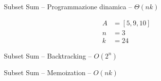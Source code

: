 \begin{frame}{Subset Sum -- Programmazione dinamica -- $\Theta(nk)$}

\vspace{-9pt}
\begin{myboxtitle}[Esempio]
\vspace{-12pt}
\begin{align*}
A &= [5,9,10]\\
n &=3\\ 
k &=24
\end{align*} 
\end{myboxtitle}


\end{frame}

\begin{frame}{Subset Sum -- Backtracking -- $O(2^n)$}

\vspace{-9pt}
\begin{Procedure}
\caption[A]{\BOOLEAN {}($\INTARRAY\ A,\ \INTEGER\ i,\ \INTEGER\ r$)}

\end{Procedure}

\vspace{-9pt}

\end{frame}


\begin{frame}{Subset Sum -- Memoization -- $O(nk)$}

\vspace{-9pt}
\begin{Procedure}
\caption[A]{\BOOLEAN {}($\INTARRAY\ A,\ \INTEGER\ i,\ \INTEGER\ r, \alert{\Dictionary\ \DP}$)}

\alert{
}
\end{Procedure}

\end{frame}

